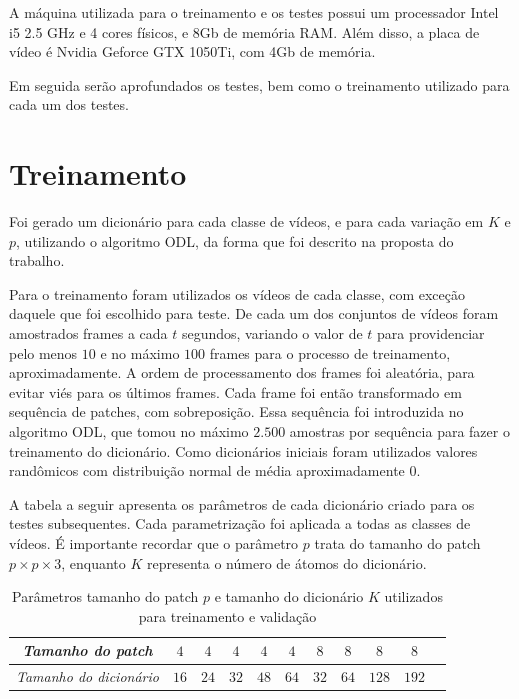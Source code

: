 \documentclass[cic,tc]{iiufrgs}
\begin{document}
A máquina utilizada para o treinamento e os testes possui um processador Intel i5 2.5 GHz e 4 cores físicos,
e 8Gb de memória RAM.
Além disso, a placa de vídeo é Nvidia Geforce GTX 1050Ti, com 4Gb de memória.

Em seguida serão aprofundados os testes, bem como o treinamento utilizado para cada um dos testes.

\section{Treinamento}
Foi gerado um dicionário para cada classe de vídeos, e para cada variação em $K$ e $p$,
utilizando o algoritmo ODL, da forma que foi descrito na proposta do trabalho.

Para o treinamento foram utilizados os vídeos de cada classe, com exceção daquele
que foi escolhido para teste.
De cada um dos conjuntos de vídeos foram amostrados frames a cada $t$ segundos, variando
o valor de $t$ para providenciar pelo menos $10$ e no máximo $100$ frames para o processo 
de treinamento, aproximadamente.
A ordem de processamento dos frames foi aleatória, para evitar viés para os últimos frames. 
Cada frame foi então transformado em sequência de patches, com sobreposição.
Essa sequência foi introduzida no algoritmo ODL, que tomou no máximo $2.500$ amostras por sequência
para fazer o treinamento do dicionário.
Como dicionários iniciais foram utilizados valores randômicos com distribuição normal de 
média aproximadamente $0$.

A tabela a seguir apresenta os parâmetros de cada dicionário criado para os testes subsequentes.
Cada parametrização foi aplicada a todas as classes de vídeos.
É importante recordar que o parâmetro $p$ trata do tamanho do patch $p \times p \times 3$, 
enquanto $K$ representa o número de átomos do dicionário.
\begin{table}[h]
    \caption{Parâmetros tamanho do patch $p$ e tamanho do dicionário $K$ utilizados para treinamento e validação}
    \centering
        \begin{tabular}{|c|c c c c c c|c c c c|}
          \hline
          \emph{Tamanho do patch} & $4$ & $4$ & $4$ & $4$ & $4$ & $8$ & $8$ & $8$ & $8$ \\
          \hline
          \emph{Tamanho do dicionário} & $16$ & $24$ & $32$ & $48$ & $64$ & $32$ & $64$ & $128$ & $192$ \\ 
          \hline
        \end{tabular}
    \label{tbl:testparams}
\end{table}
\end{document}
